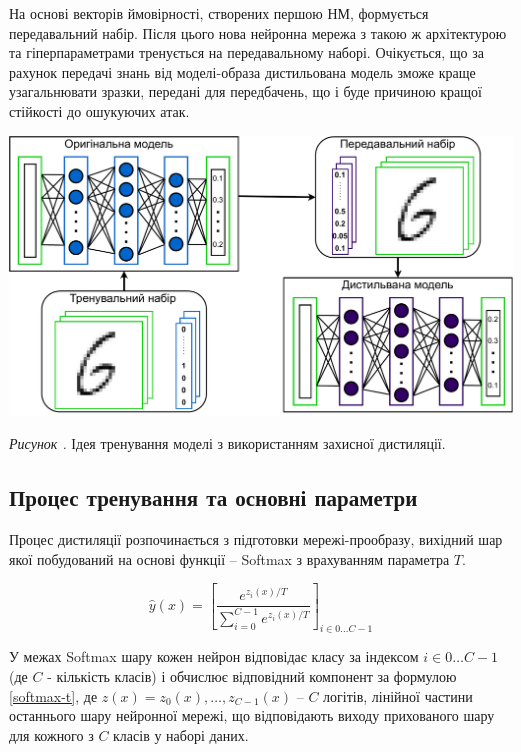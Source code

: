 \documentclass[14pt,a4paper]{extarticle}
\newcounter{e}
\newcounter{pic}
\newcommand{\pic}[1]{\refstepcounter{pic} \vspace{-0.3cm}\textit{Рисунок \arabic{pic}\label{#1}.}}
\numberwithin{equation}{section}
\numberwithin{figure}{section}
\begin{document}
 На основі векторів ймовірності, створених першою НМ, формується передавальний набір. Після цього нова нейронна мережа з такою ж архітектурою та гіперпараметрами тренується на передавальному наборі. Очікується, що за рахунок передачі знань від моделі-образа дистильована модель зможе краще узагальнювати зразки, передані для передбачень, що і буде причиною кращої стійкості до ошукуючих атак.
  \begin{center}
 	\includegraphics[width=16cm]{../images/diagrams-Distillation.pdf}
 \end{center}
 \begin{center}
 	\pic{distilation} Ідея тренування моделі з використанням захисної дистиляції.
 \end{center}
 
 
 \subsection{Процес тренування та основні параметри}  
 Процес дистиляції розпочинається з підготовки мережі-прообразу, вихідний шар якої побудований на основі функції -- Softmax з врахуванням параметра $T$.
 
 \begin{equation}
 \label{softmax-t}
 \hat{y}(x)=\left[\frac{e^{z_{i}(x) / T}}{\sum\limits_{i=0}^{C-1} e^{z_{i}(x) / T}}\right]_{i \in 0 \dots C-1}
 \end{equation}

 У межах Softmax шару кожен нейрон відповідає класу за індексом $i \in 0 \dots C-1$ (де $C$ - кількість класів) і обчислює відповідний компонент за формулою \ref{softmax-t}, де $z(x) = z_0(x), \dots , z_{C-1}(x)$ -- $C$ логітів, лінійної частини останнього шару нейронної мережі, що відповідають виходу прихованого шару для кожного з $C$ класів у наборі даних.
 
\end{document}
